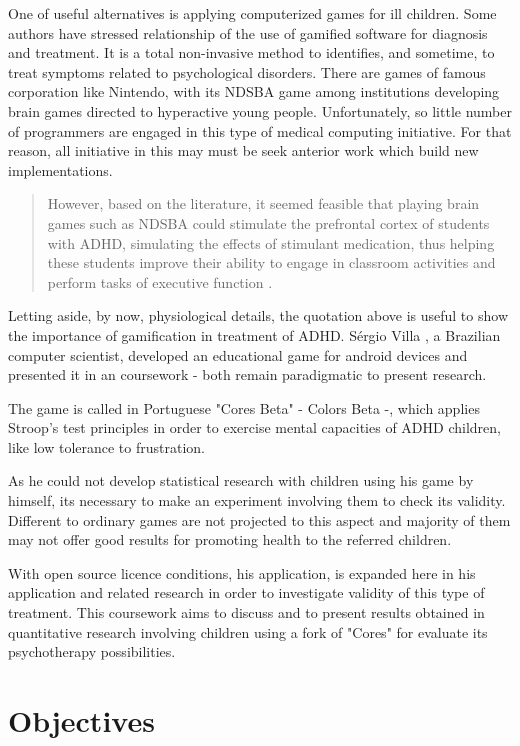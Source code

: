 One of useful alternatives is applying computerized games for ill children. Some authors have stressed relationship of the use of gamified software for diagnosis and treatment. It is a total non-invasive method to identifies, and sometime, to treat symptoms related to psychological disorders. There are games of famous corporation like Nintendo, with its NDSBA game among institutions developing brain games directed to hyperactive young people. Unfortunately, so little number of programmers are engaged in this type of medical computing initiative. For that reason, all initiative in this may must be seek anterior work which build new implementations. 

\begin{quote}
However, based on the literature, it seemed feasible that playing brain games such as NDSBA could stimulate the prefrontal cortex of students with ADHD, simulating the effects of stimulant medication, thus helping these students improve their ability to engage in classroom activities and perform tasks of executive function \citep{brainGames}. 
\end{quote}

Letting aside, by now, physiological details, the quotation above is useful to show the importance of gamification in treatment of ADHD. S\'{e}rgio Villa \citeyearpar{Villa}, a Brazilian computer scientist, developed an educational game for android devices and presented it in an coursework - both remain paradigmatic to present research.

The game is called in Portuguese "Cores Beta" - Colors Beta -, which applies Stroop's test principles in order to exercise mental capacities of ADHD children, like low tolerance to frustration. 

As he could not develop statistical research with children using his game by himself, its necessary to make an experiment involving them to check its validity. Different to ordinary games are not projected to this aspect and majority of them may not offer good results for promoting health to the referred children. 

With open source licence conditions, his application, is expanded here in his application and related research in order to investigate validity of this type of treatment. This coursework aims to discuss and to present results obtained in quantitative research involving children using a fork of "Cores" for evaluate its psychotherapy possibilities. 


\section{Objectives}
\label{sc:objectives}

